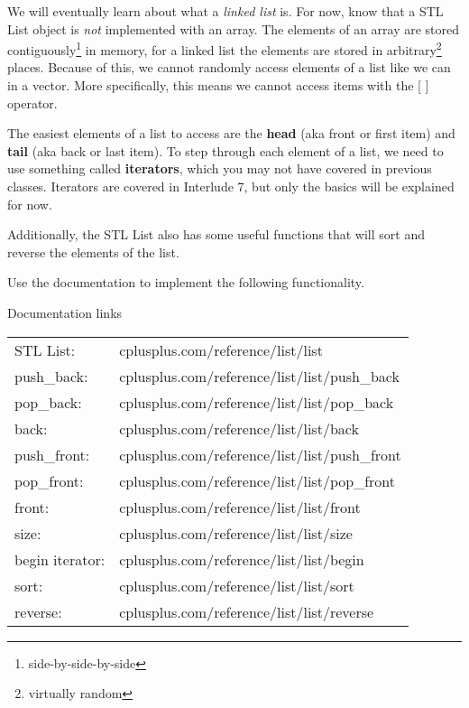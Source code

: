         We will eventually learn about what a \textit{linked list} is. For now, know that
        a STL List object is \textit{not} implemented with an array. The elements of an array
        are stored contiguously\footnote{side-by-side-by-side} in memory, for a linked list the elements are
        stored in arbitrary\footnote{virtually random} places. Because of this, we cannot
        randomly access elements of a list like we can in a vector. More specifically,
        this means we cannot access items with the [ ] operator.

        The easiest elements of a list to access are the \textbf{head} (aka front or first item)
        and \textbf{tail} (aka back or last item). To step through each element of a list,
        we need to use something called \textbf{iterators}, which you may not have covered
        in previous classes. Iterators are covered in Interlude 7, but only the basics will be
        explained for now.

        Additionally, the STL List also has some useful functions that will sort and reverse the elements of the list.

        \newpage
        
        Use the documentation to implement the following functionality.
        
        \begin{hint}{Documentation links} ~\\
            \begin{tabular}{ l l }
                STL List:       & cplusplus.com/reference/list/list \\
                push\_back:     & cplusplus.com/reference/list/list/push\_back \\
                pop\_back:      & cplusplus.com/reference/list/list/pop\_back \\
                back:           & cplusplus.com/reference/list/list/back \\
                push\_front:    & cplusplus.com/reference/list/list/push\_front \\
                pop\_front:     & cplusplus.com/reference/list/list/pop\_front \\
                front:          & cplusplus.com/reference/list/list/front \\
                size:           & cplusplus.com/reference/list/list/size \\
                begin iterator: & cplusplus.com/reference/list/list/begin \\
                sort:           & cplusplus.com/reference/list/list/sort \\
                reverse:        & cplusplus.com/reference/list/list/reverse
            \end{tabular}
        \end{hint}

